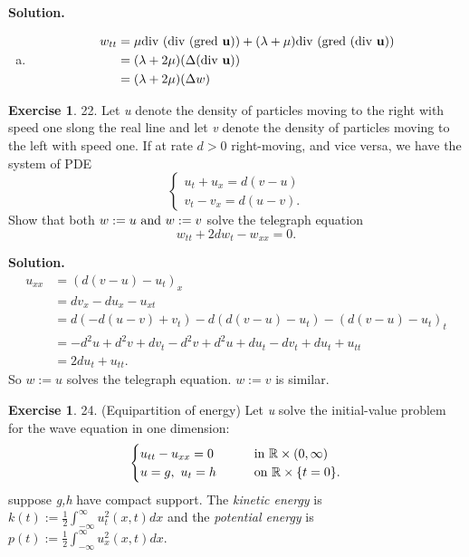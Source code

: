 \documentclass[a4paper]{book}
\newenvironment{solution}%
{\noindent\textbf{Solution.}}%
{\qedhere}
\numberwithin{equation}{chapter}
\theoremstyle{definition}
\newtheorem{exc}[exm]{Exercise}
\begin{document}
\begin{multicols}{2}
\begin{solution}
\begin{enumerate} [(a)]
  \item
    \begin{align*}
      w_{tt} &= \mu \textmd{div } (\textmd{div } (\textmd{gred } \mathbf{u})) + (\lambda + \mu)\textmd{div } (\textmd{gred }\mathbf{(\textmd{div } u)})  \\
             &= (\lambda + 2\mu) (\Delta (\textmd{div } \mathbf{u})) \\
             &= (\lambda + 2\mu) ( \Delta w)
    \end{align*}
  \end{enumerate}
\end{solution}

\begin{exc}
  22.  Let \textit{u} denote the density of particles moving to the right with speed one slong the real line and let \textit{v} denote the density of particles moving to the left with speed one. If at rate $d > 0$ right-moving, and vice versa, we have the system of PDE
  \begin{equation}
    \label{eq:5}
    \begin{cases}
      u_t + u_x = d(v - u) \\
      v_t - v_x = d(u - v).
    \end{cases}
  \end{equation}
  Show that both $w := u \textmd{ and } w := v$ solve the telegraph equation
  \begin{equation}
    \label{eq:6}
    w_{tt} + 2d w_t - w_{xx} = 0.
  \end{equation}
\end{exc}

\begin{solution}
  \begin{align*}
    u_{xx} &= {(d(v - u) - u_t)}_x \\
           &= d v_x - d u_x - u_{xt} \\
           &= d(- d(u - v) + v_t) - d(d(v - u) - u_t) - {(d(v - u) - u_t)}_t \\
           &= - d^2 u + d^2 v + d v_t - d^2 v + d^2 u + d u_t - d v_t + d u_t + u_{tt} \\
           &= 2d u_t + u_{tt} .
  \end{align*}
  So $w:= u$ solves the telegraph equation. $w := v$ is similar.
\end{solution}

\begin{exc}
  24.  (Equipartition of energy) Let \textit{u} solve the initial-value problem for the wave equation in one dimension:
  \begin{align}
    \begin{cases}
      u_{tt} - u_{xx} = 0 \qquad &\textmd{in } \mathbb{R} \times (0, \infty) \\
      u = g,\ u_t = h \qquad   &\textmd{on } \mathbb{R} \times \{t = 0\}.
    \end{cases}
  \end{align}
  suppose \textit{g,h} have compact support. The \textit{kinetic energy} is $k(t) := \frac{1}{2} \int_{- \infty}^{\infty} u_t^2(x,t) dx$ and the \textit{potential energy} is $p(t) := \frac{1}{2} \int_{-\infty}^{\infty} u_x^2(x,t) dx$.


\end{exc}
\end{multicols}
\end{document}
